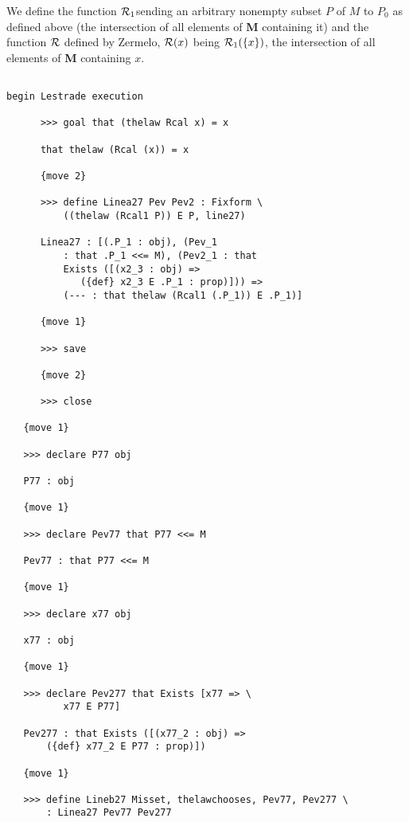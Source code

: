 \documentclass[12pt]{article}
\begin{document}
We define the function ${\cal R}_1$sending an arbitrary nonempty subset $P$ of $M$ to $P_0$ as defined above (the intersection of all elements of {\bf M} containing it)
and the function $\cal R$ defined by Zermelo, ${\cal R}(x)$ being ${\cal R}_1(\{x\})$, the intersection of all elements of {\bf M} containing $x$.

\begin{verbatim}

begin Lestrade execution

      >>> goal that (thelaw Rcal x) = x

      that thelaw (Rcal (x)) = x

      {move 2}

      >>> define Linea27 Pev Pev2 : Fixform \
          ((thelaw (Rcal1 P)) E P, line27)

      Linea27 : [(.P_1 : obj), (Pev_1 
          : that .P_1 <<= M), (Pev2_1 : that 
          Exists ([(x2_3 : obj) => 
             ({def} x2_3 E .P_1 : prop)])) => 
          (--- : that thelaw (Rcal1 (.P_1)) E .P_1)]

      {move 1}

      >>> save

      {move 2}

      >>> close

   {move 1}

   >>> declare P77 obj

   P77 : obj

   {move 1}

   >>> declare Pev77 that P77 <<= M

   Pev77 : that P77 <<= M

   {move 1}

   >>> declare x77 obj

   x77 : obj

   {move 1}

   >>> declare Pev277 that Exists [x77 => \
          x77 E P77]

   Pev277 : that Exists ([(x77_2 : obj) => 
       ({def} x77_2 E P77 : prop)])

   {move 1}

   >>> define Lineb27 Misset, thelawchooses, Pev77, Pev277 \
       : Linea27 Pev77 Pev277


\end{verbatim}
\end{document}
